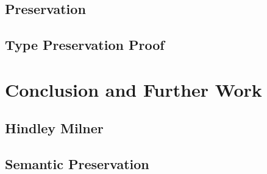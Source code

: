 \documentclass[runningheads]{llncs}
\begin{document}
\subsection{Preservation}
\subsection{Type Preservation Proof}
\section{Conclusion and Further Work}
\subsection{Hindley Milner}
\subsection{Semantic Preservation}

\begin{thebibliography}{8}



\end{thebibliography}
\end{document}
